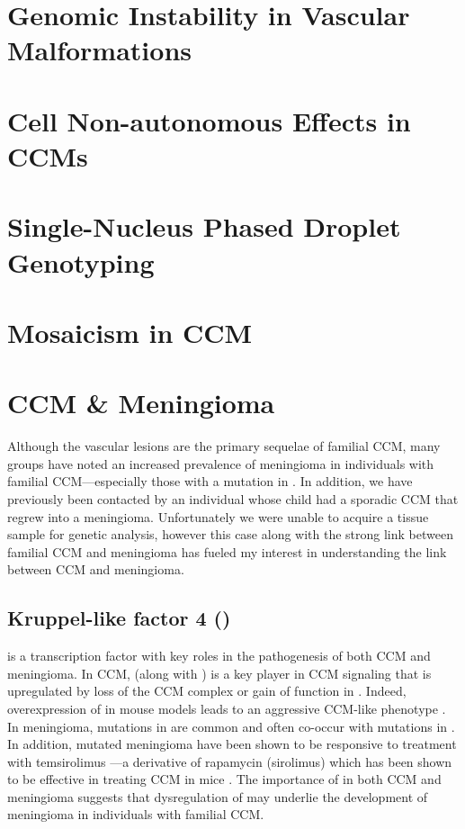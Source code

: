 \section{Genomic Instability in Vascular Malformations}



\section{Cell Non-autonomous Effects in CCMs}



\section{Single-Nucleus Phased Droplet Genotyping}


\section{Mosaicism in CCM}





\section{CCM \& Meningioma}
Although the vascular lesions are the primary sequelae of familial CCM, many groups have noted an increased prevalence of meningioma in individuals with familial CCM---especially those with a mutation in  \citep{labauge2009, riant2013, garaci2015}. In addition, we have previously been contacted by an individual whose child had a sporadic CCM that regrew into a meningioma. Unfortunately we were unable to acquire a tissue sample for genetic analysis, however this case along with the strong link between familial CCM and meningioma has fueled my interest in understanding the link between CCM and meningioma. 

\subsection{Kruppel-like factor 4 ()}
 is a transcription factor with key roles in the pathogenesis of both CCM and meningioma. In CCM,  (along with ) is a key player in CCM signaling that is upregulated by loss of the CCM complex or gain of function in  \citep{cuttano2016, zhou2016}. Indeed, overexpression of  in mouse models leads to an aggressive CCM-like phenotype \citep{ren2021}. In meningioma, mutations in  are common and often co-occur with mutations in  \citep{reuss2013}. In addition,  mutated meningioma have been shown to be responsive to treatment with temsirolimus \citep{vonSpreckelsen2020}—a derivative of rapamycin (sirolimus) which has been shown to be effective in treating CCM in mice \citep{ren2021}. The importance of  in both CCM and meningioma suggests that dysregulation of  may underlie the development of meningioma in individuals with familial CCM. 

